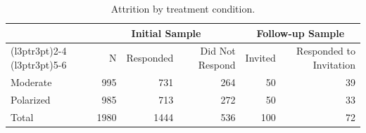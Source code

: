 \begin{table}

\caption{Attrition by treatment condition.}
\centering
\begin{tabular}[t]{lrrrrr}
\toprule
\multicolumn{1}{c}{ } & \multicolumn{3}{c}{Initial Sample} & \multicolumn{2}{c}{Follow-up Sample} \\
\cmidrule(l{3pt}r{3pt}){2-4} \cmidrule(l{3pt}r{3pt}){5-6}
 & N & Responded & Did Not Respond & Invited & Responded to Invitation\\
\midrule
Moderate & 995 & 731 & 264 & 50 & 39\\
Polarized & 985 & 713 & 272 & 50 & 33\\
Total & 1980 & 1444 & 536 & 100 & 72\\
\bottomrule
\end{tabular}
\end{table}
